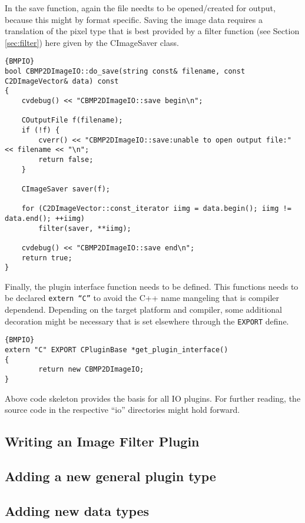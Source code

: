 \documentclass[english, 10pt, a4paper,headsepline,openany]{scrbook}
\begin{document}
\noindent 
In the save function, again the file needts to be opened/created for output, because this might by format specific. 
Saving the image data requires a translation of the pixel type that is best provided by a filter function (see Section \ref{sec:filter}) here 
  given by the CImageSaver class.
\begin{lstlisting}{BMPIO}
bool CBMP2DImageIO::do_save(string const& filename, const C2DImageVector& data) const
{
	cvdebug() << "CBMP2DImageIO::save begin\n"; 
	
	COutputFile f(filename);
	if (!f) {
		cverr() << "CBMP2DImageIO::save:unable to open output file:" << filename << "\n"; 
		return false; 
	}
		
	CImageSaver saver(f); 
	
	for (C2DImageVector::const_iterator iimg = data.begin(); iimg != data.end(); ++iimg)
		filter(saver, **iimg); 
	
	cvdebug() << "CBMP2DImageIO::save end\n"; 
	return true; 
}
\end{lstlisting}

\noindent 
Finally, the plugin interface function needs to be defined. 
This functions needs to be declared \texttt{extern ``C''} to avoid the C++ name mangeling that is compiler dependend. 
Depending on the target platform and compiler, some additional decoration might be necessary that is set elsewhere 
  through the \texttt{EXPORT} define.
\begin{lstlisting}{BMPIO}
extern "C" EXPORT CPluginBase *get_plugin_interface()
{
		return new CBMP2DImageIO;
}
\end{lstlisting}

\noindent 
Above code skeleton provides the basis for all IO plugins. 
For further reading, the source code in the respective ``io'' directories might hold forward. 

\subsection{Writing an Image Filter Plugin}
\label{ch:filterplugin}

\subsection{Adding a new general plugin type}
\label{ch:addpluginstype}

\subsection{Adding new data types}
\label{sec:adddatatypeio}



\cleardoublepage{}

\end{document}
